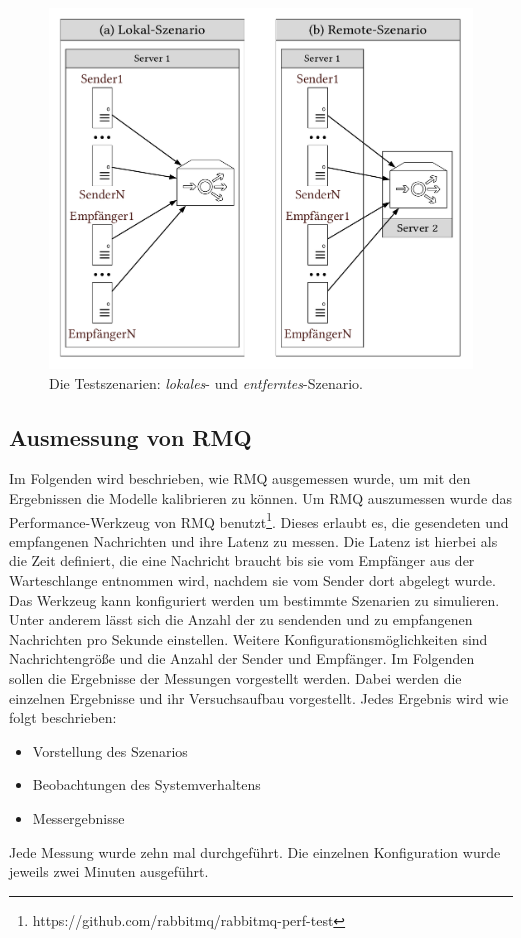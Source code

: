 \begin{figure}
\center
  \includegraphics[width=1\textwidth]{images/measurement/benchmarkSzenarioOverview.pdf}
  \caption{Die Testszenarien: \textit{lokales}- und \textit{entferntes}-Szenario.}
  \label{img:machineoverview}
\end{figure}

\subsection{Ausmessung von RMQ}
\label{sec:rmqBenchmark}
Im Folgenden wird beschrieben, wie RMQ ausgemessen wurde, um mit den Ergebnissen die Modelle kalibrieren zu können. Um RMQ auszumessen wurde das Performance-Werkzeug von RMQ benutzt\footnote{https://github.com/rabbitmq/rabbitmq-perf-test}. Dieses erlaubt es, die gesendeten und empfangenen Nachrichten und ihre Latenz zu messen. Die Latenz ist hierbei als die Zeit definiert, die eine Nachricht braucht bis sie vom Empfänger aus der Warteschlange entnommen wird, nachdem sie vom Sender dort abgelegt wurde. Das Werkzeug kann konfiguriert werden um bestimmte Szenarien zu simulieren. Unter anderem lässt sich die Anzahl der zu sendenden und zu empfangenen Nachrichten pro Sekunde einstellen. Weitere Konfigurationsmöglichkeiten sind Nachrichtengröße und die Anzahl der Sender und Empfänger. Im Folgenden sollen die Ergebnisse der Messungen vorgestellt werden. Dabei werden die einzelnen Ergebnisse und ihr Versuchsaufbau vorgestellt. Jedes Ergebnis wird wie folgt beschrieben: 
\begin{itemize}
    \item Vorstellung des Szenarios
    \item Beobachtungen des Systemverhaltens
    \item Messergebnisse
\end{itemize}
Jede Messung wurde zehn mal durchgeführt. Die einzelnen Konfiguration wurde jeweils zwei Minuten ausgeführt. 



